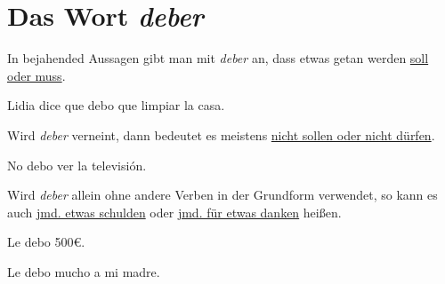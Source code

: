 \section{Das Wort \textit{deber}}
In bejahended Aussagen gibt man mit \textit{deber} an, dass 
etwas getan werden \underline{soll oder muss}.
\begin{ejemplos}
    \item Lidia dice que debo que limpiar la casa.
\end{ejemplos}
Wird \textit{deber} verneint, dann bedeutet es meistens 
\underline{nicht sollen oder nicht dürfen}.
\begin{ejemplos}
    \item No debo ver la televisi\'on.
\end{ejemplos}
Wird \textit{deber} allein ohne andere Verben in der Grundform
verwendet, so kann es auch \underline{jmd. etwas schulden} oder
\underline{jmd. für etwas danken} heißen.
\begin{ejemplos}
    \item Le debo 500€.
    \item Le debo mucho a mi madre. 
\end{ejemplos}